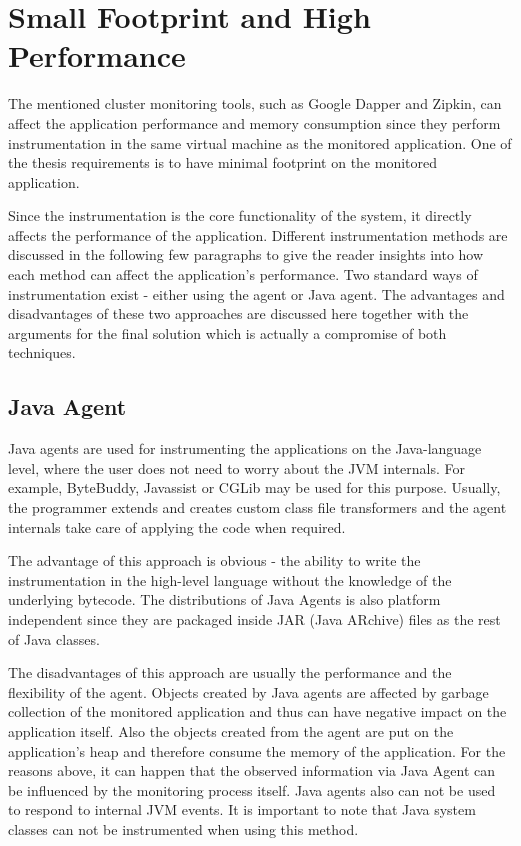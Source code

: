 \section{Small Footprint and High Performance}
The mentioned cluster monitoring tools, such as Google Dapper and Zipkin, can affect the application performance and memory consumption since they perform instrumentation in the same virtual machine as the monitored application. One of the thesis requirements is to have minimal footprint on the monitored application.

Since the instrumentation is the core functionality of the system, it directly affects the performance of the application. Different instrumentation methods are discussed in the following few paragraphs to give the reader insights into how each method can affect the application's performance. Two standard ways of instrumentation exist - either using the agent or Java agent. The advantages and disadvantages of these two approaches are discussed here together with the arguments for the final solution which is actually a compromise of both techniques.
\subsection{Java Agent}
\label{java_agent}
Java agents are used for instrumenting the applications on the Java-language level, where the user does not need to worry about the JVM internals. For example, ByteBuddy, Javassist or CGLib may be used for this purpose. Usually, the programmer extends and creates custom class file transformers and the agent internals take care of applying the code when required. 

The advantage of this approach is obvious - the ability to write the instrumentation in the high-level language without the knowledge of the underlying bytecode. The distributions of Java Agents is also platform independent since they are packaged inside JAR (Java ARchive) files as the rest of Java classes. 

The disadvantages of this approach are usually the performance and the flexibility of the agent. Objects created by Java agents are affected by garbage collection of the monitored application and thus can have negative impact on the application itself. Also the objects created from the agent are put on the application's heap and therefore consume the  memory of the application. For the reasons above, it can happen that the observed information via Java Agent can be influenced by the monitoring process itself. Java agents also can not be used to respond to internal JVM events. It is important to note that Java system classes can not be instrumented when using this method.
